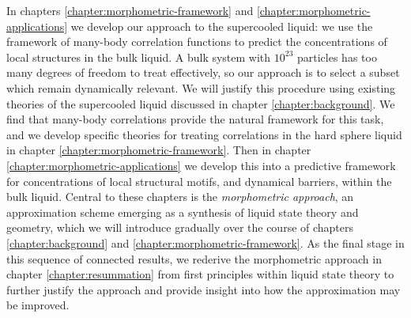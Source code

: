 \documentclass[11pt,twoside]{report}
\begin{document}
In chapters \ref{chapter:morphometric-framework} and \ref{chapter:morphometric-applications} we develop our approach to the supercooled liquid: we use the framework of many-body correlation functions to predict the concentrations of local structures in the bulk liquid.
A bulk system with $10^{23}$ particles has too many degrees of freedom to treat effectively, so our approach is to select a subset which remain dynamically relevant.
We will justify this procedure using existing theories of the supercooled liquid discussed in chapter \ref{chapter:background}.
We find that many-body correlations provide the natural framework for this task, and we develop specific theories for treating correlations in the hard sphere liquid in chapter \ref{chapter:morphometric-framework}.
Then in chapter \ref{chapter:morphometric-applications} we develop this into a predictive framework for concentrations of local structural motifs, and dynamical barriers, within the bulk liquid.
Central to these chapters is the \emph{morphometric approach}, an approximation scheme emerging as a synthesis of liquid state theory and geometry, which we will introduce gradually over the course of chapters \ref{chapter:background} and \ref{chapter:morphometric-framework}.
As the final stage in this sequence of connected results, we rederive the morphometric approach in chapter \ref{chapter:resummation} from first principles within liquid state theory to further justify the approach and provide insight into how the approximation may be improved.
\end{document}
